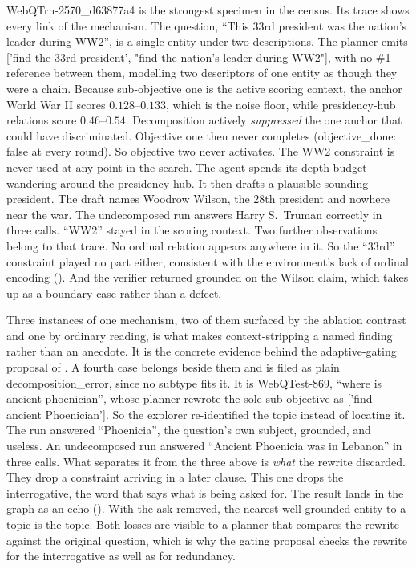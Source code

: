 \textsf{WebQTrn-2570\_d63877a4} is the strongest specimen in the census. Its
trace shows every link of the mechanism. The question, ``This 33rd president was
the nation's leader during WW2'', is a single entity under two descriptions. The
planner emits \textsf{['find the 33rd president', "find the nation's leader
during WW2"]}, with no \textsf{\#1} reference between them, modelling two
descriptors of one entity as though they were a chain. Because sub-objective one
is the active scoring context, the anchor \textsf{World War II} scores
$0.128$--$0.133$, which is the noise floor, while presidency-hub relations score
$0.46$--$0.54$. Decomposition actively \emph{suppressed} the one anchor that
could have discriminated. Objective one then never completes
(\textsf{objective\_done: false} at every round). So objective two never
activates. The WW2 constraint is never used at any point in the search. The
agent spends its depth budget wandering around the presidency hub. It then
drafts a plausible-sounding president. The draft names Woodrow Wilson, the 28th
president and nowhere near the war. The undecomposed run answers Harry S.~Truman
correctly in three calls. ``WW2'' stayed in the scoring context. Two further
observations belong to that trace. No ordinal relation appears anywhere in it.
So the ``33rd'' constraint played no part either, consistent with the
environment's lack of ordinal encoding (). And the verifier
returned \textsf{grounded} on the Wilson claim, which 
takes up as a boundary case rather than a defect.

Three instances of one mechanism, two of them surfaced by the ablation contrast
and one by ordinary reading, is what makes context-stripping a named finding
rather than an anecdote. It is the concrete evidence behind the adaptive-gating
proposal of . A fourth case belongs beside them and is filed as
plain \textsf{decomposition\_error}, since no subtype fits it. It is
\textsf{WebQTest-869}, ``where is ancient phoenician'', whose planner rewrote
the sole sub-objective as \textsf{['find ancient Phoenician']}. So the explorer
re-identified the topic instead of locating it. The run answered ``Phoenicia'',
the question's own subject, grounded, and useless. An undecomposed run answered
``Ancient Phoenicia was in Lebanon'' in three calls. What separates it from the
three above is \emph{what} the rewrite discarded. They drop a constraint
arriving in a later clause. This one drops the interrogative, the word that says
what is being asked for. The result lands in the graph as an \textsf{echo}
(). With the ask removed, the nearest well-grounded entity to a
topic is the topic. Both losses are visible to a planner that compares the
rewrite against the original question, which is why the gating proposal checks
the rewrite for the interrogative as well as for redundancy.

